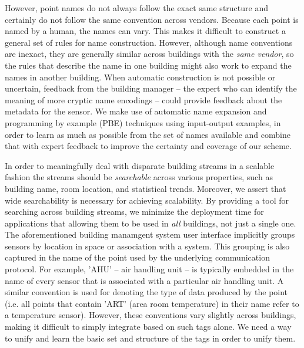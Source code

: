 However, point names do not 
always follow the exact same structure and certainly do not follow the same convention 
across vendors.  Because each
point is named by a human, the names can vary. This makes it difficult to construct a general
set of rules for name construction. However, although name conventions are inexact, they 
are generally similar across buildings with the \emph{same vendor}, so the rules that 
describe the name in one building might also work to expand the names in another building.
When automatic construction is not possible or
uncertain, feedback from the building manager -- the expert who can identify the meaning of 
more cryptic name encodings -- could provide feedback about the metadata for the sensor.
We make use of automatic name expansion and programming by example (PBE) 
techniques using input-output examples, in order to learn
as much as possible from the set of names available and combine that with expert feedback to
improve the certainty and coverage of our scheme.

In order to meaningfully deal with disparate building streams in a scalable 
fashion the streams should be \emph{searchable} across various properties, such
as building name, room location, and statistical trends.  Moreover, we
assert that wide searchability is necessary for achieving scalability.  By providing a tool for
searching across building streams, we minimize the deployment time for applications that 
allowing them to be used in \emph{all} buildings, not just a single one.  The aforementioned 
building manamgent system user interface implicitly groups sensors by location in space
or association with a system.  This grouping is also captured in the name of the point used by
the underlying communication protocol.  For example, 'AHU' -- air handling unit -- is typically
embedded in the name of every sensor that is associated with a particular air handling unit.
A similar convention is used for denoting the type of data produced by the point (i.e. all points
that contain 'ART' (area room temperature)  in their name refer to a temperature sensor).
However, these conventions vary slightly across buildings, making it difficult to
simply integrate based on such tags alone.  We need a way to unify and learn the basic
set and structure of the tags in order to unify them.

